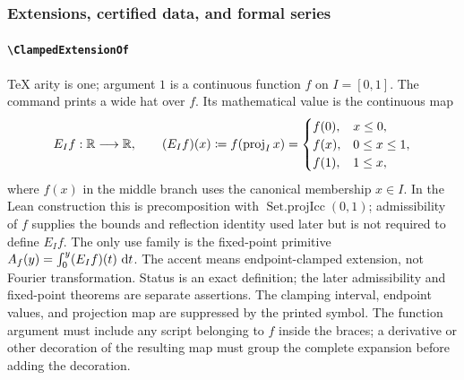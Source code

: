 \documentclass[11pt,oneside]{article}
\theoremstyle{definition}
\theoremstyle{remark}
\DeclareRobustCommand{\commandname}[1]{\texttt{\textbackslash#1}}
\DeclareRobustCommand{\localaccentname}[1]{\commandname{#1}}
\begin{document}
\subsubsection{Extensions, certified data, and formal series}

\paragraph{\localaccentname{ClampedExtensionOf}}
TeX arity is one; argument \(1\) is a continuous function \(f\) on
\(I=[0,1]\).  The command prints a wide hat over \(f\).  Its mathematical value is
the continuous map
\[
 E_I f:\mathbb{R}\longrightarrow\mathbb{R},\qquad
 (E_I f)(x)
 \mathrel{\coloneqq}
 f\!\left(\operatorname{proj}_{I}x\right)
 =
 \begin{cases}
  f(0),&x\le0,\\
  f(x),&0\le x\le1,\\
  f(1),&1\le x,
 \end{cases}
\]
where \(f(x)\) in the middle branch uses the canonical membership
\(x\in I\).  In the Lean construction this is precomposition with
\(\operatorname{Set.projIcc}(0,1)\); admissibility of \(f\) supplies the bounds
and reflection identity used later but is not required to define \(E_I f\).
The only use family is the fixed-point primitive
\(A_f(y)=\int_0^y(E_If)(t)\,\mathop{}\!\mathrm{d} t\).
The accent means endpoint-clamped extension, not Fourier transformation.
Status is an exact definition; the later admissibility and fixed-point theorems are
separate assertions.  The clamping interval, endpoint values, and projection map are suppressed by the
printed symbol.  The function argument must include any script belonging to
\(f\) inside the braces; a derivative or other decoration of the resulting map
must group the complete expansion before adding the decoration.
\end{document}
